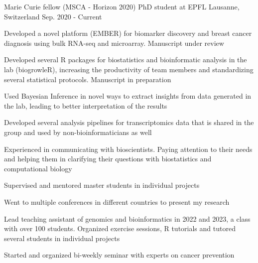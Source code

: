 




\begin{cventries}

  \cventry
    {Marie Curie fellow (MSCA - Horizon 2020)}
    {PhD student at EPFL}
    {Lausanne, Switzerland} 
    {Sep. 2020 - Current} 
    {
      \begin{cvitems} 
        \item {Developed a novel platform (EMBER) for biomarker discovery and breast 
               cancer diagnosis using bulk RNA-seq and microarray. 
               Manuscript under review}
        \item {Developed several R packages for biostatistics and bioinformatic
                analysis in the lab (biogrowleR), increasing the productivity of
                team members and standardizing several statistical protocols. 
                Manuscript in preparation}
        \item {Used Bayesian Inference in novel ways to extract insights from 
               data generated in the lab, leading to better
               interpretation of the results}
        \item { Developed several analysis pipelines for transcriptomics
                data that is shared in the group and used by non-bioinformaticians as well}
        \item { Experienced in communicating with bioscientists. Paying attention to their
                needs and helping them in clarifying their questions with biostatistics 
                and computational biology}
        \item { Supervised and mentored master students in individual projects}
        \item { Went to multiple conferences in different countries to present my 
                research}
        \item { Lead teaching assistant of genomics and bioinformatics in 2022 and 2023,
                a class with over 100 students. Organized exercise sessions, R tutorials
                and tutored several students in individual projects}
        \item { Started and organized bi-weekly seminar with experts on cancer prevention}
      \end{cvitems} 
    }


\end{cventries}
